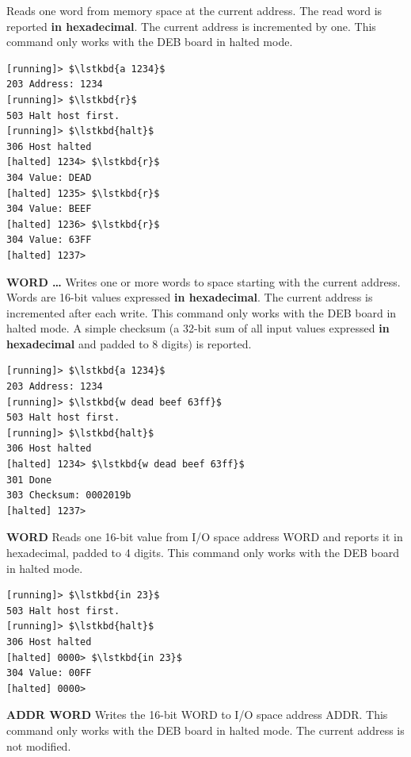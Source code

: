 \begin{description}
\item{\bfseries{}} Reads one word from memory space at the current
  address. The read word is reported {\bfseries in hexadecimal}. The current
  address is incremented by one. This command only works with the
  \gls{DEB} board in halted mode.

{\small
\begin{lstlisting}[style=deb]
[running]> $\lstkbd{a 1234}$
203 Address: 1234
[running]> $\lstkbd{r}$
503 Halt host first.
[running]> $\lstkbd{halt}$
306 Host halted
[halted] 1234> $\lstkbd{r}$
304 Value: DEAD
[halted] 1235> $\lstkbd{r}$
304 Value: BEEF
[halted] 1236> $\lstkbd{r}$
304 Value: 63FF
[halted] 1237> 
\end{lstlisting}
}


\item{\bfseries{} WORD …} Writes one or more words to space starting
  with the current address. Words are 16-bit values expressed {\bfseries in
    hexadecimal}. The current address is incremented after each
  write. This command only works with the \gls{DEB} board in halted
  mode. A simple checksum (a 32-bit sum of all input values expressed
  {\bfseries in hexadecimal} and padded to 8 digits) is reported.

{\small
\begin{lstlisting}[style=deb]
[running]> $\lstkbd{a 1234}$
203 Address: 1234
[running]> $\lstkbd{w dead beef 63ff}$
503 Halt host first.
[running]> $\lstkbd{halt}$
306 Host halted
[halted] 1234> $\lstkbd{w dead beef 63ff}$
301 Done
303 Checksum: 0002019b
[halted] 1237> 
\end{lstlisting}
}


\item{\bfseries{} WORD} Reads one 16-bit value from I/O space address
  WORD and reports it in hexadecimal, padded to 4 digits. This command
  only works with the \gls{DEB} board in halted mode.

{\small
\begin{lstlisting}[style=deb]
[running]> $\lstkbd{in 23}$
503 Halt host first.
[running]> $\lstkbd{halt}$
306 Host halted
[halted] 0000> $\lstkbd{in 23}$
304 Value: 00FF
[halted] 0000> 
\end{lstlisting}
}


\item{\bfseries{} ADDR WORD} Writes the 16-bit WORD to I/O space
  address ADDR. This command only works with the \gls{DEB} board in
  halted mode. The current address is not modified.


\end{description}
